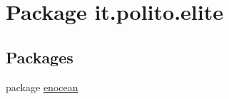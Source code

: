 \hypertarget{namespaceit_1_1polito_1_1elite}{}\section{Package it.\+polito.\+elite}
\label{namespaceit_1_1polito_1_1elite}
\subsection*{Packages}
\begin{DoxyCompactItemize}
\item 
package \hyperlink{namespaceit_1_1polito_1_1elite_1_1enocean}{enocean}
\end{DoxyCompactItemize}

